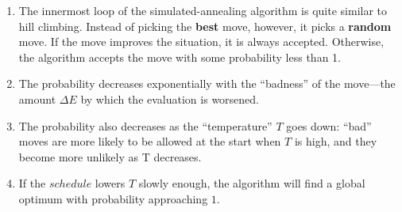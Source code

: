 \begin{enumerate}
    \item The innermost loop of the simulated-annealing algorithm is quite similar to hill climbing.
    Instead of picking the \textbf{best} move, however, it picks a \textbf{random} move.
    If the move improves the situation, it is always accepted.
    Otherwise, the algorithm accepts the move with some probability less than 1.
    \hfill \cite{ai/book/Artificial-Intelligence-A-Modern-Approach/Russell-Norvig}

    \item The probability decreases exponentially with the “badness” of the move—the amount $\Delta E$ by which the evaluation is worsened.
    \hfill \cite{ai/book/Artificial-Intelligence-A-Modern-Approach/Russell-Norvig}

    \item The probability also decreases as the “temperature” $T$ goes down: “bad” moves are more likely to be allowed at the start when $T$ is high, and they become more unlikely as T decreases.
    \hfill \cite{ai/book/Artificial-Intelligence-A-Modern-Approach/Russell-Norvig}

    \item If the $schedule$ lowers $T$ slowly enough, the algorithm will find a global optimum with probability approaching $1$.
    \hfill \cite{ai/book/Artificial-Intelligence-A-Modern-Approach/Russell-Norvig}
\end{enumerate}












